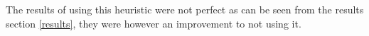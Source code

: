 The results of using this heuristic were not perfect as can be seen from the results section \ref{results}, they were however an improvement to not using it.



